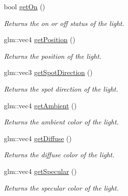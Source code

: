 \begin{DoxyCompactItemize}
\mbox{\label{class_light_a853a20a23503b56aeb0176c42a45e30b}} 
bool \hyperlink{class_light_a853a20a23503b56aeb0176c42a45e30b}{get\+On} ()
\begin{DoxyCompactList}\small\item\em Returns the on or off status of the light. \end{DoxyCompactList}\item 
\mbox{\label{class_light_a1adb137688bc9a8f6a0ef25ad326ae53}} 
glm\+::vec4 \hyperlink{class_light_a1adb137688bc9a8f6a0ef25ad326ae53}{get\+Position} ()
\begin{DoxyCompactList}\small\item\em Returns the position of the light. \end{DoxyCompactList}\item 
\mbox{\label{class_light_a1cb2081206fa1e8f88e0640925d26c39}} 
glm\+::vec3 \hyperlink{class_light_a1cb2081206fa1e8f88e0640925d26c39}{get\+Spot\+Direction} ()
\begin{DoxyCompactList}\small\item\em Returns the spot direction of the light. \end{DoxyCompactList}\item 
\mbox{\label{class_light_af8301704fd80d5948ffb0f50a9919810}} 
glm\+::vec4 \hyperlink{class_light_af8301704fd80d5948ffb0f50a9919810}{get\+Ambient} ()
\begin{DoxyCompactList}\small\item\em Returns the ambient color of the light. \end{DoxyCompactList}\item 
\mbox{\label{class_light_a77698b0dab118c9d8a07be583f5fb890}} 
glm\+::vec4 \hyperlink{class_light_a77698b0dab118c9d8a07be583f5fb890}{get\+Diffuse} ()
\begin{DoxyCompactList}\small\item\em Returns the diffuse color of the light. \end{DoxyCompactList}\item 
\mbox{\label{class_light_a8300421f327aed73849e0cf944c875b9}} 
glm\+::vec4 \hyperlink{class_light_a8300421f327aed73849e0cf944c875b9}{get\+Specular} ()
\begin{DoxyCompactList}\small\item\em Returns the specular color of the light. \end{DoxyCompactList}\item 

\end{DoxyCompactItemize}
